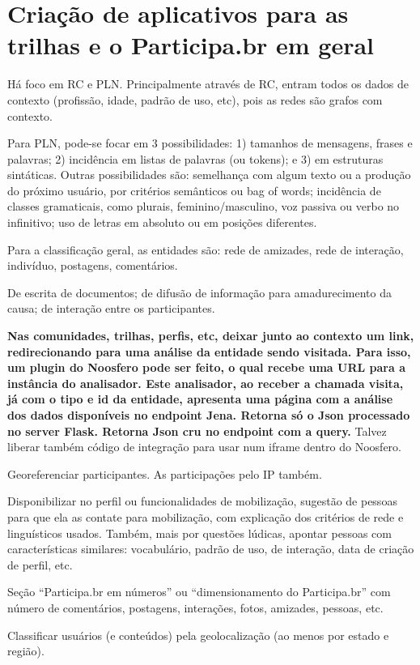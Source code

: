 \documentclass[12pt]{report}
\begin{document}
\chapter{Criação de aplicativos para as trilhas e o Participa.br em geral}
Há foco em RC e PLN. Principalmente através de RC, entram todos os dados de contexto (profissão, idade, padrão de uso, etc), pois as redes são grafos com contexto.

Para PLN, pode-se focar em 3 possibilidades: 1) tamanhos de mensagens, frases e palavras; 2) incidência em listas de palavras (ou tokens); e 3) em estruturas sintáticas. Outras possibilidades são: semelhança com algum texto ou a produção do próximo usuário, por critérios semânticos ou bag of words; incidência de classes gramaticais, como plurais, feminino/masculino, voz passiva ou verbo no infinitivo; uso de letras em absoluto ou em posições diferentes.

Para a classificação geral, as entidades são: rede de amizades, rede de interação, indivíduo, postagens, comentários.

De escrita de documentos; de difusão de informação para amadurecimento da causa; de interação entre os participantes.

{\bf Nas comunidades, trilhas, perfis, etc, deixar junto ao contexto um link, redirecionando para uma análise da entidade sendo visitada. Para isso, um plugin do Noosfero pode ser feito, o qual recebe uma URL para a instância do analisador. Este analisador, ao receber a chamada visita, já com o tipo e id da entidade, apresenta uma página com a análise dos dados disponíveis no endpoint Jena. Retorna só o Json processado no server Flask. Retorna Json cru no endpoint com a query.} Talvez liberar também código de integração para usar num iframe dentro do Noosfero.

Georeferenciar participantes. As participações pelo IP também.

Disponibilizar no perfil ou funcionalidades de mobilização, sugestão de pessoas para que ela as contate para mobilização, com explicação dos critérios de rede e linguísticos usados. Também, mais por questões lúdicas, apontar pessoas com características similares: vocabulário, padrão de uso, de interação, data de criação de perfil, etc.

Seção ``Participa.br em números'' ou ``dimensionamento do Participa.br'' com número de comentários, postagens, interações, fotos, amizades, pessoas, etc.

Classificar usuários (e conteúdos) pela geolocalização (ao menos por estado e região).
\end{document}
